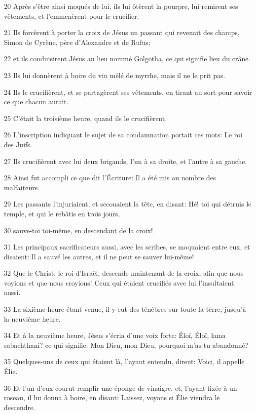 \par 20 Après s'être ainsi moqués de lui, ils lui ôtèrent la pourpre, lui remirent ses vêtements, et l'emmenèrent pour le crucifier.
\par 21 Ils forcèrent à porter la croix de Jésus un passant qui revenait des champs, Simon de Cyrène, père d'Alexandre et de Rufus;
\par 22 et ils conduisirent Jésus au lieu nommé Golgotha, ce qui signifie lieu du crâne.
\par 23 Ils lui donnèrent à boire du vin mêlé de myrrhe, mais il ne le prit pas.
\par 24 Ils le crucifièrent, et se partagèrent ses vêtements, en tirant au sort pour savoir ce que chacun aurait.
\par 25 C'était la troisième heure, quand ils le crucifièrent.
\par 26 L'inscription indiquant le sujet de sa condamnation portait ces mots: Le roi des Juifs.
\par 27 Ils crucifièrent avec lui deux brigands, l'un à sa droite, et l'autre à sa gauche.
\par 28 Ainsi fut accompli ce que dit l'Écriture: Il a été mis au nombre des malfaiteurs.
\par 29 Les passants l'injuriaient, et secouaient la tête, en disant: Hé! toi qui détruis le temple, et qui le rebâtis en trois jours,
\par 30 sauve-toi toi-même, en descendant de la croix!
\par 31 Les principaux sacrificateurs aussi, avec les scribes, se moquaient entre eux, et disaient: Il a sauvé les autres, et il ne peut se sauver lui-même!
\par 32 Que le Christ, le roi d'Israël, descende maintenant de la croix, afin que nous voyions et que nous croyions! Ceux qui étaient crucifiés avec lui l'insultaient aussi.
\par 33 La sixième heure étant venue, il y eut des ténèbres sur toute la terre, jusqu'à la neuvième heure.
\par 34 Et à la neuvième heure, Jésus s'écria d'une voix forte: Éloï, Éloï, lama sabachthani? ce qui signifie: Mon Dieu, mon Dieu, pourquoi m'as-tu abandonné?
\par 35 Quelques-uns de ceux qui étaient là, l'ayant entendu, dirent: Voici, il appelle Élie.
\par 36 Et l'un d'eux courut remplir une éponge de vinaigre, et, l'ayant fixée à un roseau, il lui donna à boire, en disant: Laissez, voyons si Élie viendra le descendre.
